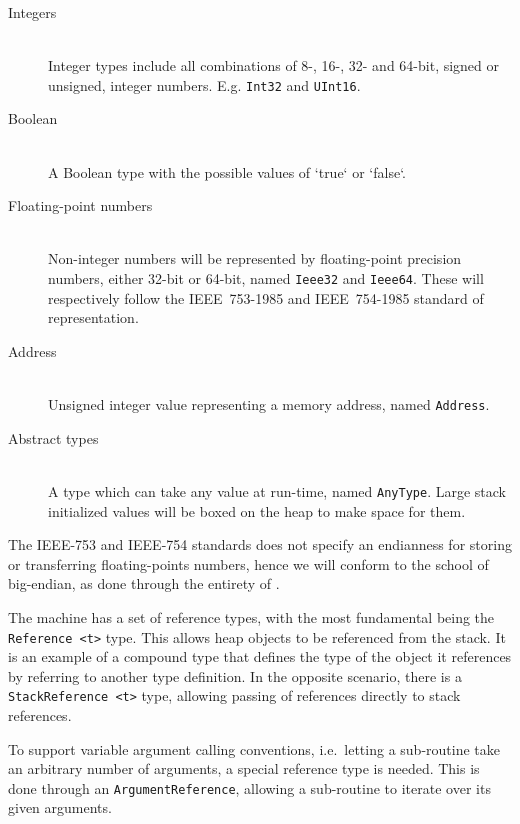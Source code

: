 \begin{description}
\item[Integers] \hfill\\
  Integer types include all combinations of 8-, 16-, 32- and 64-bit, signed or
  unsigned, integer numbers. E.g. {\tt Int32} and {\tt UInt16}.

\item[Boolean] \hfill\\
  A Boolean type with the possible values of `true` or `false`.

\item[Floating-point numbers] \hfill\\
  Non-integer numbers will be represented by floating-point precision numbers,
  either 32-bit or 64-bit, named {\tt Ieee32} and {\tt Ieee64}. These will
  respectively follow the IEEE~753-1985 and IEEE~754-1985 standard of
  representation.

\item[Address] \hfill\\
  Unsigned integer value representing a memory address, named {\tt Address}.

\item[Abstract types] \hfill\\
  A type which can take any value at run-time, named {\tt AnyType}. Large stack
  initialized values will be boxed on the heap to make space for them.
\end{description}

The IEEE-753 and IEEE-754 standards does not specify an endianness for storing
or transferring floating-points numbers, hence we will conform to the school of
big-endian, as done through the entirety of \thename{}.


The machine has a set of reference types, with the most fundamental being the
{\tt Reference <t>} type. This allows heap objects to be referenced from the
stack. It is an example of a compound type that defines the type of the object
it references by referring to another type definition. In the opposite scenario,
there is a {\tt StackReference <t>} type, allowing passing of references
directly to stack references.

To support variable argument calling conventions, i.e.~letting a sub-routine
take an arbitrary number of arguments, a special reference type is needed. This
is done through an {\tt ArgumentReference}, allowing a sub-routine to iterate
over its given arguments.

